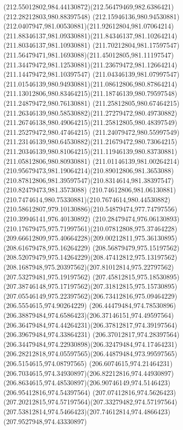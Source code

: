 {{		\curveto(212.55012802,984.44130872)(212.56479469,982.6386421)(212.28212803,980.88397548)
		\curveto(212.15946136,980.94530881)(212.0407947,981.00530881)(211.92612804,981.07064214)
		\curveto(211.88346137,981.09330881)(211.84346137,981.10264214)(211.80346137,981.10930881)
		\curveto(211.70212804,981.17597547)(211.56479471,981.1693088)(211.45012805,981.11197547)
		\curveto(211.34479472,981.12530881)(211.23679472,981.12664214)(211.14479472,981.10397547)
		\curveto(211.04346139,981.07997547)(211.01546139,980.94930881)(211.08612806,980.87864214)
		\curveto(211.13012806,980.83464215)(211.18746139,980.79597548)(211.24879472,980.76130881)
		\curveto(211.25812805,980.67464215)(211.26346139,980.58530882)(211.27279472,980.49730882)
		\curveto(211.26746138,980.49064215)(211.25812805,980.48397549)(211.25279472,980.47464215)
		\curveto(211.24079472,980.55997549)(211.23146139,980.64530882)(211.21679472,980.73064215)
		\curveto(211.20346139,980.81064215)(211.11946139,980.83730881)(211.05812806,980.80930881)
		\curveto(211.01146139,981.00264214)(210.95679473,981.19064214)(210.89012806,981.3653088)
		\curveto(210.87812806,981.39597547)(210.8314614,981.38397547)(210.82479473,981.3573088)
		\curveto(210.74612806,981.06130881)(210.7474614,980.75330881)(210.7674614,980.44530882)
		\curveto(210.58612807,979.10130886)(210.54879474,977.74797556)(210.39946141,976.40130892)
		\curveto(210.28479474,976.06130893)(210.17679475,975.71997561)(210.07812808,975.37464228)
		\curveto(209.66612809,975.40664228)(209.00212811,975.36130895)(208.61679478,975.16264229)
		\curveto(208.56879479,975.15197562)(208.52079479,975.14264229)(208.47412812,975.13197562)
		\curveto(208.1687948,975.20397562)(207.81012814,975.22797562)(207.53279481,975.19197562)
		\curveto(207.45812815,975.18530895)(207.38746148,975.17197562)(207.31812815,975.15730895)
		\curveto(207.05546149,975.22397562)(206.73412816,975.09464229)(206.5554615,974.90264229)
		\curveto(206.44479484,974.78530896)(206.38879484,974.6586423)(206.37146151,974.49597564)
		\curveto(206.36479484,974.44264231)(206.37812817,974.39197564)(206.39679484,974.33864231)
		\curveto(206.37012817,974.28397564)(206.34479484,974.22930898)(206.32479484,974.17464231)
		\curveto(206.28212818,974.05597565)(206.44879484,973.99597565)(206.5154615,974.08797565)
		\curveto(206.6074615,974.21464231)(206.7034615,974.34930897)(206.82212816,974.44930897)
		\curveto(206.8634615,974.48530897)(206.90746149,974.5146423)(206.95412816,974.54397564)
		\curveto(207.07412816,974.5626423)(207.20212815,974.57197564)(207.33279482,974.57197564)
		\curveto(207.53812814,974.5466423)(207.74612814,974.4866423)(207.9527948,974.43330897)
}}
